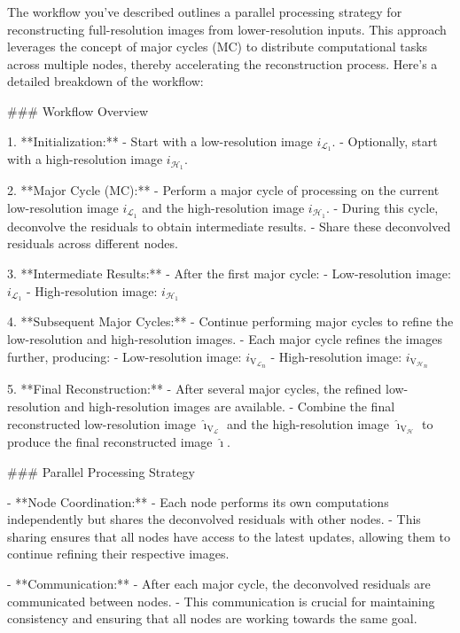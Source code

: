 The workflow you've described outlines a parallel processing strategy for reconstructing full-resolution images from lower-resolution inputs. This approach leverages the concept of major cycles (MC) to distribute computational tasks across multiple nodes, thereby accelerating the reconstruction process. Here’s a detailed breakdown of the workflow:

### Workflow Overview

1. **Initialization:**
   - Start with a low-resolution image \( i_{\mathcal{L}_1} \).
   - Optionally, start with a high-resolution image \( i_{\mathcal{H}_1} \).

2. **Major Cycle (MC):**
   - Perform a major cycle of processing on the current low-resolution image \( i_{\mathcal{L}_1} \) and the high-resolution image \( i_{\mathcal{H}_1} \).
   - During this cycle, deconvolve the residuals to obtain intermediate results.
   - Share these deconvolved residuals across different nodes.

3. **Intermediate Results:**
   - After the first major cycle:
     - Low-resolution image: \( i_{\mathcal{L}_1} \)
     - High-resolution image: \( i_{\mathcal{H}_1} \)

4. **Subsequent Major Cycles:**
   - Continue performing major cycles to refine the low-resolution and high-resolution images.
   - Each major cycle refines the images further, producing:
     - Low-resolution image: \( i_{{\text{V}_\mathcal{L}}_n} \)
     - High-resolution image: \( i_{{\text{V}_\mathcal{H}}_n} \)

5. **Final Reconstruction:**
   - After several major cycles, the refined low-resolution and high-resolution images are available.
   - Combine the final reconstructed low-resolution image \( \hat{\imath}_{\text{V}_\mathcal{L}} \) and the high-resolution image \( \hat{\imath}_{\text{V}_\mathcal{H}} \) to produce the final reconstructed image \( \hat{\imath} \).

### Parallel Processing Strategy

- **Node Coordination:**
  - Each node performs its own computations independently but shares the deconvolved residuals with other nodes.
  - This sharing ensures that all nodes have access to the latest updates, allowing them to continue refining their respective images.

- **Communication:**
  - After each major cycle, the deconvolved residuals are communicated between nodes.
  - This communication is crucial for maintaining consistency and ensuring that all nodes are working towards the same goal.

